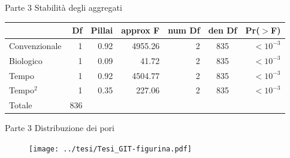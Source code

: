 \documentclass[10pt]{beamer}
\begin{document}
\begin{frame}[label=Anova]{Parte 3 \small{Stabilità degli aggregati}}
  \hyperlink{Composizionale}{}
  \footnotesize
  \begin{table}
    \centering
    \begin{tabular}{lrrrrcr}
      \hline
      & Df&Pillai& approx F & num Df & den Df & Pr($>$F) \\ 
      \hline
      Convenzionale & 1 & 0.92 & 4955.26  &      2 &    835 & $<10^{-3}$\\ 
      Biologico     & 1 & 0.09 & 41.72    &      2 &    835 & $<10^{-3}$\\ 
      Tempo         & 1 & 0.92 & 4504.77  &      2 &    835 & $<10^{-3}$\\ 
      Tempo$^2$     & 1 & 0.35 & 227.06   &      2 &    835 & $<10^{-3}$\\ 
      Totale        & 836 &    &          &        &        &          \\ 
      \hline
    \end{tabular}
  \end{table}
\end{frame}

\begin{frame}[label=Porosimetria]{Parte 3 \small{Distribuzione dei pori}}
  \hyperlink{finale}{}
  
  \begin{figure}
    \texttt{[image: ../tesi/Tesi\_GIT-figurina.pdf]}
  \end{figure}
\end{frame}
\end{document}
